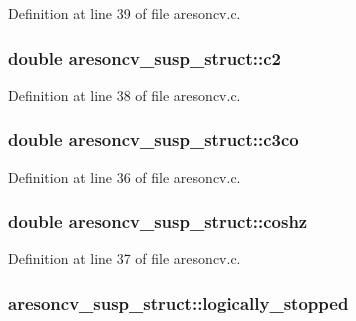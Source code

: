 Definition at line 39 of file aresoncv.\+c.

\subsubsection[{\texorpdfstring{c2}{c2}}]{\setlength{\rightskip}{0pt plus 5cm}double aresoncv\+\_\+susp\+\_\+struct\+::c2}\hypertarget{structaresoncv__susp__struct_af399025e19a9d148152c5681b21ab4d9}{}\label{structaresoncv__susp__struct_af399025e19a9d148152c5681b21ab4d9}


Definition at line 38 of file aresoncv.\+c.

\subsubsection[{\texorpdfstring{c3co}{c3co}}]{\setlength{\rightskip}{0pt plus 5cm}double aresoncv\+\_\+susp\+\_\+struct\+::c3co}\hypertarget{structaresoncv__susp__struct_a1f6cab8068a5f3606f43527609bae8d3}{}\label{structaresoncv__susp__struct_a1f6cab8068a5f3606f43527609bae8d3}


Definition at line 36 of file aresoncv.\+c.

\subsubsection[{\texorpdfstring{coshz}{coshz}}]{\setlength{\rightskip}{0pt plus 5cm}double aresoncv\+\_\+susp\+\_\+struct\+::coshz}\hypertarget{structaresoncv__susp__struct_a6e7c9a2e06d615f418f38152ec5513b6}{}\label{structaresoncv__susp__struct_a6e7c9a2e06d615f418f38152ec5513b6}


Definition at line 37 of file aresoncv.\+c.

\subsubsection[{\texorpdfstring{logically\+\_\+stopped}{logically_stopped}}]{ aresoncv\+\_\+susp\+\_\+struct\+::logically\+\_\+stopped}\hypertarget{structaresoncv__susp__struct_ad07d404acc6d2f9c7a0e3be0311e10f4}{}\label{structaresoncv__susp__struct_ad07d404acc6d2f9c7a0e3be0311e10f4}


